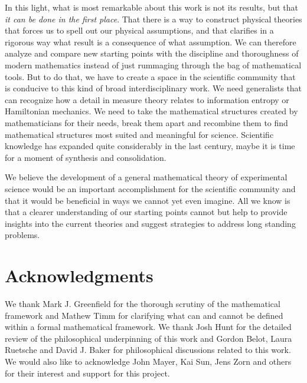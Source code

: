 \documentclass[%
reprint,
amsmath,amssymb,
aps,
prx,
]{revtex4-1}
\theoremstyle{plain}%
\theoremstyle{definition}
\theoremstyle{remark}
\begin{document}
In this light, what is most remarkable about this work is not its results, but that \emph{it can be done in the first place}. That there is a way to construct physical theories that forces us to spell out our physical assumptions, and that clarifies in a rigorous way what result is a consequence of what assumption. We can therefore analyze and compare new starting points with the discipline and thoroughness of modern mathematics instead of just rummaging through the bag of mathematical tools. But to do that, we have to create a space in the scientific community that is conducive to this kind of broad interdisciplinary work. We need generalists that can recognize how a detail in measure theory relates to information entropy or Hamiltonian mechanics. We need to take the mathematical structures created by mathematicians for their needs, break them apart and recombine them to find mathematical structures most suited and meaningful for science. Scientific knowledge has expanded quite considerably in the last century, maybe it is time for a moment of synthesis and consolidation.

We believe the development of a general mathematical theory of experimental science would be an important accomplishment for the scientific community and that it would be beneficial in ways we cannot yet even imagine. All we know is that a clearer understanding of our starting points cannot but help to provide insights into the current theories and suggest strategies to address long standing problems.

\section{Acknowledgments}

We thank Mark J. Greenfield for the thorough scrutiny of the mathematical framework and Mathew Timm for clarifying what can and cannot be defined within a formal mathematical framework. We thank Josh Hunt for the detailed review of the philosophical underpinning of this work and Gordon Belot, Laura Ruetsche and David J. Baker for philosophical discussions related to this work. We would also like to acknowledge John Mayer, Kai Sun, Jens Zorn and others for their interest and support for this project.


\end{document}
